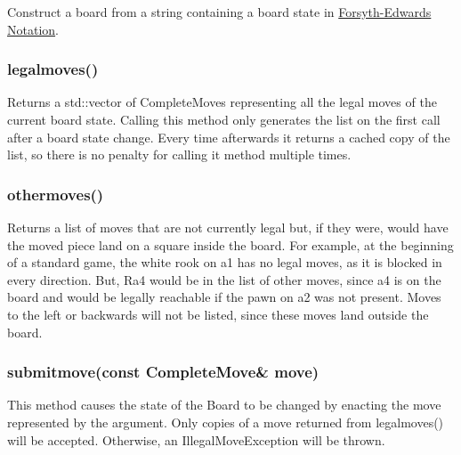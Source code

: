 \documentclass[letterpaper]{article}
\newcommand{\code}[1]{#1}
\renewcommand\_{\textunderscore\allowbreak}
\begin{document}
Construct a board from a string containing a board state in \href{https://en.wikipedia.org/wiki/Forsyth\%E2\%80\%93Edwards\_Notation}{Forsyth-Edwards Notation}.

\subsubsection{legal\_moves()}

Returns a \code{std::vector} of \code{Complete\_Move}s representing all the legal moves of the current board state. Calling this method only generates the list on the first call after a board state change. Every time afterwards it returns a cached copy of the list, so there is no penalty for calling it method multiple times.

\subsubsection{other\_moves()}

Returns a list of moves that are not currently legal but, if they were, would have the moved piece land on a square inside the board. For example, at the beginning of a standard game, the white rook on a1 has no legal moves, as it is blocked in every direction. But, Ra4 would be in the list of other moves, since a4 is on the board and would be legally reachable if the pawn on a2 was not present. Moves to the left or backwards will not be listed, since these moves land outside the board.

\subsubsection[submit\_move]{submit\_move(const Complete\_Move\& move)}
\label{board-submit-move-section}

This method causes the state of the \code{Board} to be changed by enacting the move represented by the argument. Only copies of a move returned from \code{legal\_moves()} will be accepted. Otherwise, an \code{Illegal\_Move\_Exception} will be thrown.
\end{document}
